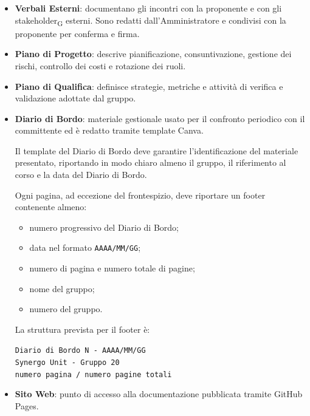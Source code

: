 \begin{itemize}
    \item \textbf{Verbali Esterni}: documentano gli incontri con la proponente e con
    gli stakeholder\textsubscript{G} esterni. Sono redatti dall'Amministratore e
    condivisi con la proponente per conferma e firma.

    \item \textbf{Piano di Progetto}: descrive pianificazione, consuntivazione,
    gestione dei rischi, controllo dei costi e rotazione dei ruoli.

    \item \textbf{Piano di Qualifica}: definisce strategie, metriche e attività di
    verifica e validazione adottate dal gruppo.

    \item \textbf{Diario di Bordo}: materiale gestionale usato per il confronto
        periodico con il committente ed è redatto tramite template Canva.

        Il template del Diario di Bordo deve garantire l'identificazione del materiale
        presentato, riportando in modo chiaro almeno il gruppo, il riferimento al corso
        e la data del Diario di Bordo.

        Ogni pagina, ad eccezione del frontespizio, deve riportare un footer
        contenente almeno:

        \begin{itemize}
            \item numero progressivo del Diario di Bordo;
            \item data nel formato \texttt{AAAA/MM/GG};
            \item numero di pagina e numero totale di pagine;
            \item nome del gruppo;
            \item numero del gruppo.
        \end{itemize}

        La struttura prevista per il footer è:

        \begin{center}
        \texttt{Diario di Bordo N\textdegree{} - AAAA/MM/GG}\\
        \texttt{Synergo Unit - Gruppo 20} \\
        \texttt{numero pagina / numero pagine totali}\\
        \end{center}

    \item \textbf{Sito Web}: punto di accesso alla documentazione pubblicata tramite
    GitHub Pages.
\end{itemize}

